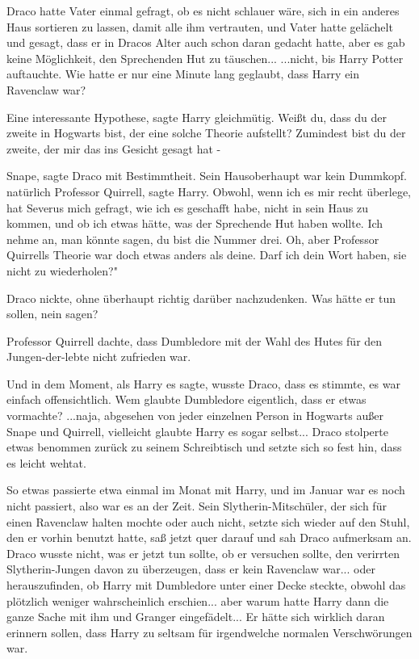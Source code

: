 Draco hatte Vater einmal gefragt, ob es nicht schlauer wäre, sich in ein anderes
Haus sortieren zu lassen, damit alle ihm vertrauten, und Vater hatte gelächelt
und gesagt, dass er in Dracos Alter auch schon daran gedacht hatte, aber es gab
keine Möglichkeit, den Sprechenden Hut zu täuschen... ...nicht, bis Harry Potter
auftauchte. Wie hatte er nur eine Minute lang geglaubt, dass Harry ein Ravenclaw
war?

\glqq Eine interessante Hypothese\grqq{}, sagte Harry gleichmütig. \glqq Weißt
du, dass du der zweite in Hogwarts bist, der eine solche Theorie aufstellt?
Zumindest bist du der zweite, der mir das ins Gesicht gesagt hat -\grqq{}

\glqq Snape\grqq{}, sagte Draco mit Bestimmtheit. Sein Hausoberhaupt war kein
Dummkopf. \glqq natürlich Professor Quirrell\grqq{}, sagte Harry. \glqq Obwohl,
wenn ich es mir recht überlege, hat Severus mich gefragt, wie ich es geschafft
habe, nicht in sein Haus zu kommen, und ob ich etwas hätte, was der Sprechende
Hut haben wollte. Ich nehme an, man könnte sagen, du bist die Nummer drei. Oh,
aber Professor Quirrells Theorie war doch etwas anders als deine. Darf ich dein
Wort haben, sie nicht zu wiederholen?"

Draco nickte, ohne überhaupt richtig darüber nachzudenken. Was hätte er tun
sollen, nein sagen?

\glqq Professor Quirrell dachte, dass Dumbledore mit der Wahl des Hutes für den
Jungen-der-lebte nicht zufrieden war.\grqq{}

Und in dem Moment, als Harry es sagte, wusste Draco, dass es stimmte, es war
einfach offensichtlich. Wem glaubte Dumbledore eigentlich, dass er etwas
vormachte? ...naja, abgesehen von jeder einzelnen Person in Hogwarts außer Snape
und Quirrell, vielleicht glaubte Harry es sogar selbst... Draco stolperte etwas
benommen zurück zu seinem Schreibtisch und setzte sich so fest hin, dass es
leicht wehtat.

So etwas passierte etwa einmal im Monat mit Harry, und im Januar war es noch
nicht passiert, also war es an der Zeit. Sein Slytherin-Mitschüler, der sich für
einen Ravenclaw halten mochte oder auch nicht, setzte sich wieder auf den Stuhl,
den er vorhin benutzt hatte, saß jetzt quer darauf und sah Draco aufmerksam an.
Draco wusste nicht, was er jetzt tun sollte, ob er versuchen sollte, den
verirrten Slytherin-Jungen davon zu überzeugen, dass er kein Ravenclaw war...
oder herauszufinden, ob Harry mit Dumbledore unter einer Decke steckte, obwohl
das plötzlich weniger wahrscheinlich erschien... aber warum hatte Harry dann die
ganze Sache mit ihm und Granger eingefädelt... Er hätte sich wirklich daran
erinnern sollen, dass Harry zu seltsam für irgendwelche normalen Verschwörungen
war.

